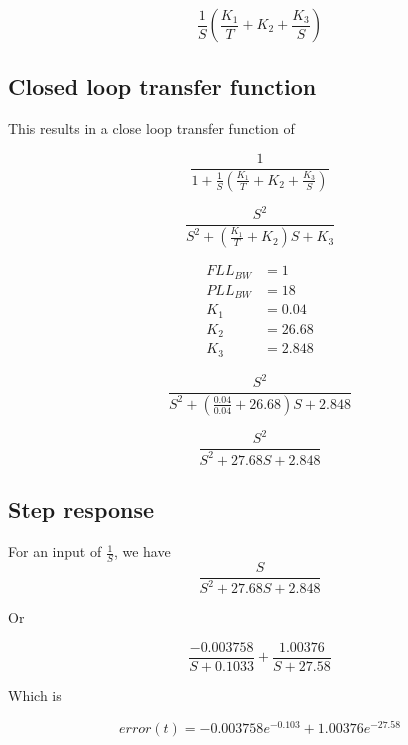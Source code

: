 \begin{equation}
\frac{1}{S} (\frac{K_1}{T} + K_2 +  \frac{K_3}{S})
\end{equation}

 
\subsection{Closed loop transfer function}
This results in a close loop transfer function of 

\begin{equation}
\frac{1}{1+\frac{1}{S} (\frac{K_1}{T} + K_2 +  \frac{K_3}{S})}
\end{equation}



\begin{equation}
\frac{S^2}{S^2 + (\frac{K_1}{T} + K_2)S + K_3}
\end{equation}

\begin{framed}
\begin{align}
FLL_{BW} &=1\\
PLL_{BW} &=18\\
K_1 &=  0.04\\
K_2 &= 26.68\\
K_3 &=  2.848
\end{align}
\end{framed}

\begin{equation}
\frac{S^2}{S^2 + (\frac{0.04}{0.04} +  26.68)S + 2.848}
\end{equation}

\begin{equation}
\frac{S^2}{S^2 + 27.68 S + 2.848}
\end{equation}

\subsection{Step response}

For an input of $\frac{1}{S}$, we have 
\begin{equation}
\frac{S}{S^2 + 27.68 S + 2.848}
\end{equation}

Or 

\begin{equation}
\frac{-0.003758}{S+0.1033} + \frac{1.00376}{S+27.58}
\end{equation}

Which is

\begin{equation}
error(t) =  -0.003758 e^{-0.103} + 1.00376 e^{-27.58}
\end{equation}


